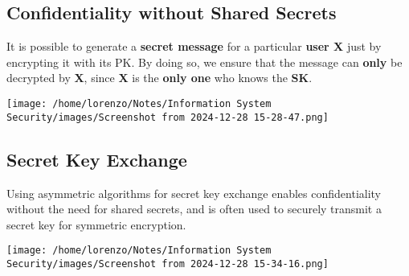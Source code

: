 \subsection{Confidentiality without Shared Secrets}
\begin{minipage}{0.6\textwidth}
	\vspace{-0.6cm}
It is possible to generate a \textbf{secret message} for a particular \textbf{user X} just by encrypting it with
its PK. By doing so, we ensure that the message can \textbf{only} be decrypted by \textbf{X}, since \textbf{X} is the
\textbf{only one} who knows the \textbf{SK}. 
\end{minipage} 
\hspace{0.3cm}
\begin{minipage}{0.4\textwidth}
    \centering
    \texttt{[image: /home/lorenzo/Notes/Information System Security/images/Screenshot from 2024-12-28 15-28-47.png]}
\end{minipage}
\vspace{-0.5cm}
\subsection{Secret Key Exchange}
\begin{minipage}{0.5\textwidth}
\vspace{-0.5cm}
Using asymmetric algorithms for secret key exchange enables confidentiality without
the need for shared secrets, and is often used to securely transmit a secret key for
symmetric encryption.
\end{minipage} 
\hspace{0.3cm}
\begin{minipage}{0.5\textwidth}
    \centering
    \texttt{[image: /home/lorenzo/Notes/Information System Security/images/Screenshot from 2024-12-28 15-34-16.png]}
\end{minipage}

